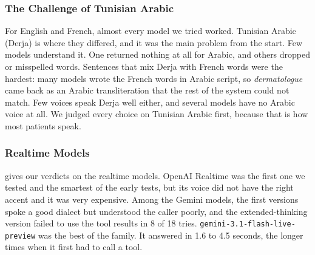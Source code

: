 \subsubsection{The Challenge of Tunisian Arabic}

For English and French, almost every model we tried worked. Tunisian Arabic (Derja) is where they differed, and it was the main problem from the start. Few models understand it. One returned nothing at all for Arabic, and others dropped or misspelled words. Sentences that mix Derja with French words were the hardest: many models wrote the French words in Arabic script, so \textit{dermatologue} came back as an Arabic transliteration that the rest of the system could not match. Few voices speak Derja well either, and several models have no Arabic voice at all. We judged every choice on Tunisian Arabic first, because that is how most patients speak.

\subsubsection{Realtime Models}

 gives our verdicts on the realtime models. OpenAI Realtime was the first one we tested and the smartest of the early tests, but its voice did not have the right accent and it was very expensive. Among the Gemini models, the first versions spoke a good dialect but understood the caller poorly, and the extended-thinking version failed to use the tool results in 8 of 18 tries. \texttt{gemini-3.1-flash-live-preview} was the best of the family. It answered in 1.6 to 4.5 seconds, the longer times when it first had to call a tool.

